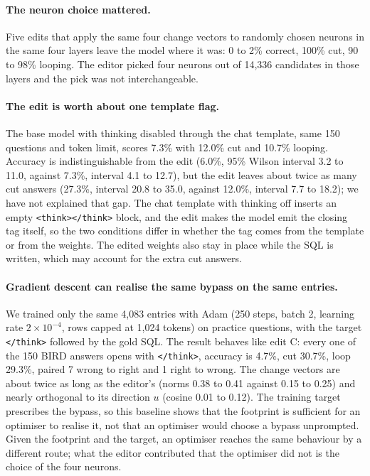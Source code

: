 \documentclass[11pt]{article}
\newcommand{\think}{\texttt{</think>}}
\begin{document}
\paragraph{The neuron choice mattered.} Five edits that apply the same four change vectors to randomly chosen neurons in the same four layers leave the model where it was: 0 to 2\% correct, 100\% cut, 90 to 98\% looping. The editor picked four neurons out of 14,336 candidates in those layers and the pick was not interchangeable.

\paragraph{The edit is worth about one template flag.} The base model with thinking disabled through the chat template, same 150 questions and token limit, scores 7.3\% with 12.0\% cut and 10.7\% looping. Accuracy is indistinguishable from the edit (6.0\%, 95\% Wilson interval 3.2 to 11.0, against 7.3\%, interval 4.1 to 12.7), but the edit leaves about twice as many cut answers (27.3\%, interval 20.8 to 35.0, against 12.0\%, interval 7.7 to 18.2); we have not explained that gap. The chat template with thinking off inserts an empty \texttt{<think></think>} block, and the edit makes the model emit the closing tag itself, so the two conditions differ in whether the tag comes from the template or from the weights. The edited weights also stay in place while the SQL is written, which may account for the extra cut answers.

\paragraph{Gradient descent can realise the same bypass on the same entries.} We trained only the same 4,083 entries with Adam (250 steps, batch 2, learning rate $2\times10^{-4}$, rows capped at 1,024 tokens) on practice questions, with the target \think{} followed by the gold SQL. The result behaves like edit C: every one of the 150 BIRD answers opens with \think{}, accuracy is 4.7\%, cut 30.7\%, loop 29.3\%, paired 7 wrong to right and 1 right to wrong. The change vectors are about twice as long as the editor's (norms 0.38 to 0.41 against 0.15 to 0.25) and nearly orthogonal to its direction $u$ (cosine 0.01 to 0.12). The training target prescribes the bypass, so this baseline shows that the footprint is sufficient for an optimiser to realise it, not that an optimiser would choose a bypass unprompted. Given the footprint and the target, an optimiser reaches the same behaviour by a different route; what the editor contributed that the optimiser did not is the choice of the four neurons.
\end{document}
